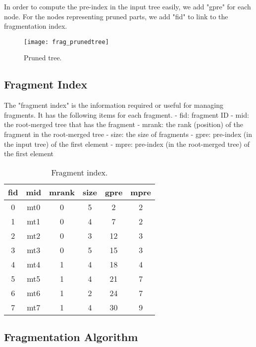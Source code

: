 In order to compute the pre-index in the input tree easily, we add
"gpre" for each node.  For the nodes representing pruned parts,
we add "fid" to link to the fragmentation index.

\begin{figure}[t]  
	\centering
	\texttt{[image: frag\_prunedtree]}
	\caption{Pruned tree.}
	\label{fig:frag_prunedtree}	
\end{figure}


\subsection{Fragment Index}

The "fragment index" is the information required or useful for managing
fragments.  It has the following items for each fragment.
- fid: fragment ID
- mid: the root-merged tree that has the fragment
- mrank: the rank (position) of the fragment in the root-merged tree
- size: the size of fragments
- gpre: pre-index (in the input tree) of the first element
- mpre: pre-index (in the root-merged tree) of the first element

\begin{table}[t]
	
	\begin{tabular}{c|c|c|c|c|c}
			\caption{Fragment index.}
		\label{tab:fragmentindex}	
		\centering
		\hline
		 fid & mid    & mrank & size & gpre & mpre \\
		 \hline
		0   & mt0 & 0     &   5  & 2    & 2    \\
		1   & mt1 & 0     &   4  & 7    & 2    \\
		2   & mt2 & 0     &   3  & 12   & 3    \\
		3   & mt3 & 0     &   5  & 15   & 3    \\
		4   & mt4 & 1     &   4  & 18   & 4    \\
		5   & mt5 & 1     &   4  & 21   & 7    \\
		6   & mt6 & 1     &   2  & 24   & 7    \\
		7   & mt7 & 1     &   4  & 30   & 9    \\
		\hline
	\end{tabular}
\end{table}




\subsection{Fragmentation Algorithm}

